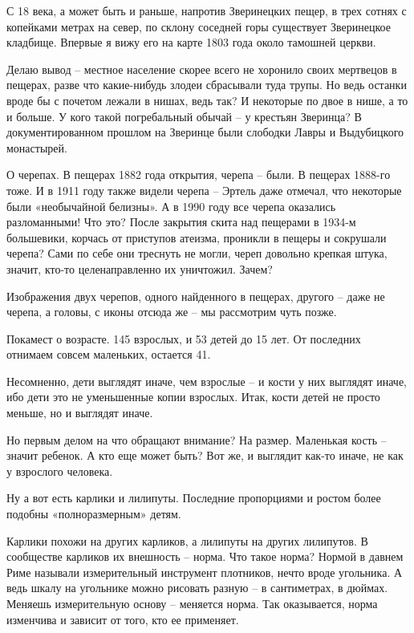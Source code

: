 С 18 века, а может быть и раньше, напротив Зверинецких пещер, в трех сотнях с копейками метрах на север, по склону соседней горы существует Зверинецкое кладбище. Впервые я вижу его на карте 1803 года около тамошней церкви.

Делаю вывод – местное население скорее всего не хоронило своих мертвецов в пещерах, разве что какие-нибудь злодеи сбрасывали туда трупы. Но ведь останки вроде бы с почетом лежали в нишах, ведь так? И некоторые по двое в нише, а то и больше. У кого такой погребальный обычай – у крестьян Зверинца? В документированном прошлом на Зверинце были слободки Лавры и Выдубицкого монастырей.

О черепах. В пещерах 1882 года открытия, черепа – были. В пещерах 1888-го тоже. И в 1911 году также видели черепа – Эртель даже отмечал, что некоторые были «необычайной белизны». А в 1990 году все черепа оказались разломанными! Что это? После закрытия скита над пещерами в 1934-м большевики, корчась от приступов атеизма, проникли в пещеры и сокрушали черепа? Сами по себе они треснуть не могли, череп довольно крепкая штука, значит, кто-то целенаправленно их уничтожил. Зачем?

Изображения двух черепов, одного найденного в пещерах, другого – даже не черепа, а головы, с иконы отсюда же – мы рассмотрим чуть позже.

Покамест о возрасте. 145 взрослых, и 53 детей до 15 лет. От последних отнимаем совсем маленьких, остается 41.

Несомненно, дети выглядят иначе, чем взрослые – и кости у них выглядят иначе, ибо дети это не уменьшенные копии взрослых. Итак, кости детей не просто меньше, но и выглядят иначе.

Но первым делом на что обращают внимание? На размер. Маленькая кость – значит ребенок. А кто еще может быть? Вот же, и выглядит как-то иначе, не как у взрослого человека.

Ну а вот есть карлики и лилипуты. Последние пропорциями и ростом более подобны «полноразмерным» детям.


Карлики похожи на других карликов, а лилипуты на других лилипутов. В сообществе карликов их внешность – норма. Что такое норма? Нормой в давнем Риме называли измерительный инструмент плотников, нечто вроде угольника. А ведь шкалу на угольнике можно рисовать разную – в сантиметрах, в дюймах. Меняешь измерительную основу – меняется норма. Так оказывается, норма изменчива и зависит от того, кто ее применяет.

